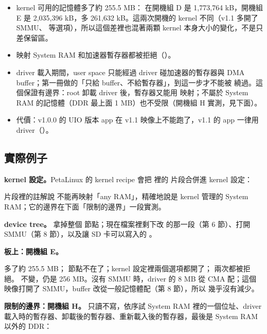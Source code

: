 \begin{gain}
\begin{itemize}
\item kernel 可用的記憶體多了約 255.5 MB： 在開機組 D 是 1,773,764 kB，開機組 E 是 2,035,396 kB，多 261,632 kB。這兩次開機的 kernel 不同（v1.1 多開了 SMMU、 等選項），所以這個差裡也混著兩顆 kernel 本身大小的變化，不是只差保留區。
\item {} 映射 System RAM 和加速器暫存器都被拒絕（）。
\item driver 載入期間，user space 只能經過 driver 碰加速器的暫存器與 DMA buffer；第一冊做的「只給 buffer、不給暫存器」，到這一步才不能被  繞過。這個保證有邊界：root 卸載 driver 後，暫存器又能用  映射；不屬於 System RAM 的記憶體（DDR 最上面 1 MB）也不受限（開機組 H 實測，見下面）。
\item 代價：v1.0.0 的 UIO 版本 app 在 v1.1 映像上不能跑了，v1.1 的 app 一律用 driver（）。
\end{itemize}
\end{gain}

\subsection{實際例子}

\textbf{kernel 設定。}PetaLinux 的 kernel recipe 會把  裡的  片段合併進 kernel 設定：


片段裡的註解說  不能再映射「any RAM」，精確地說是 kernel 管理的 System RAM；它的邊界在下面「限制的邊界」一段實測。

\textbf{device tree。} 拿掉整個  節點；現在檔案裡剩下改  的那一段（第 6 節）、打開 SMMU（第 8 節），以及讓 SD 卡可以寫入的 。

\textbf{板上：開機組 E。}


 多了約 255.5 MB； 節點不在了；kernel 設定裡兩個選項都開了； 兩次都被拒絕。 不變，仍是 256 MB。沒有 SMMU 時，driver 的 8 MB 從 CMA 配；這個映像打開了 SMMU，buffer 改從一般記憶體配（第 8 節），所以  幾乎沒有減少。

\textbf{限制的邊界：開機組 H。} 只讀不寫，依序試 System RAM 裡的一個位址、driver 載入時的暫存器、卸載後的暫存器、重新載入後的暫存器，最後是 System RAM 以外的 DDR：

